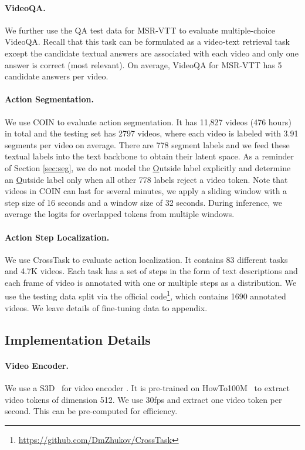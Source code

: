 \documentclass[11pt]{article}
\begin{document}
\paragraph{VideoQA.} We further use the QA test data \cite{yu2018joint} for MSR-VTT to evaluate multiple-choice VideoQA.
Recall that this task can be formulated as a video-text retrieval task except the candidate textual answers are associated with each video and only one answer is correct (most relevant).
On average, VideoQA for MSR-VTT has 5 candidate answers per video.

\paragraph{Action Segmentation.} We use COIN \cite{tang2019coin} to evaluate action segmentation.
It has 11,827 videos (476 hours) in total and the testing set has 2797 videos, where each video is labeled with 3.91 segments per video on average.
There are 778 segment labels and we feed these textual labels into the text backbone to obtain their latent space.
As a reminder of Section \ref{sec:seg}, we do not model the \underline{O}utside label explicitly and determine an \underline{O}utside label only when all other 778 labels reject a video token. 
Note that videos in COIN can last for several minutes, we apply a sliding window with a step size of 16 seconds and a window size of 32 seconds.
During inference, we average the logits for overlapped tokens from multiple windows.

\paragraph{Action Step Localization.} We use CrossTask \cite{zhukov2019cross} to evaluate action localization. 
It contains 83 different tasks and 4.7K videos. 
Each task has a set of steps in the form of text descriptions and each frame of video is annotated with one or multiple steps as a distribution.
We use the testing data split via the official code\footnote{ \url{https://github.com/DmZhukov/CrossTask}}, which contains 1690 annotated videos.
We leave details of fine-tuning data to appendix.


\subsection{Implementation Details}
\paragraph{Video Encoder.}
We use a S3D~\cite{xie2018rethinking} for video encoder . It is pre-trained on HowTo100M~\cite{miech2020end} to extract video tokens of dimension 512.
We use 30fps and extract one video token per second. This can be pre-computed for efficiency. 
\end{document}
